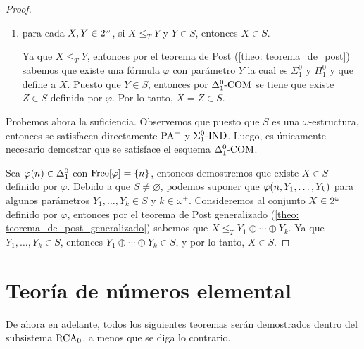 \begin{proof}
\begin{enumerate}
		Por lo tanto, $X\oplus Y\in S$.

		\item para cada $X, Y\in2^{\omega}$, si $X\leq_{T} Y$ y $Y\in S$, entonces $X\in S$.

		Ya que $X\leq_{T} Y$, entonces por el teorema de Post (\ref{theo: teorema_de_post}) sabemos que existe una fórmula $\varphi$ con parámetro $Y$ la cual es $\Sigma_{1}^{0}$ y $\Pi_{1}^{0}$ y que define a $X$. Puesto que $Y\in S$, entonces por $\Delta_{1}^{0}\text{-}\mathrm{COM}$ se tiene que existe $Z\in S$ definida por $\varphi$. Por lo tanto, $X = Z\in S$.
	\end{enumerate}

	Probemos ahora la suficiencia. Observemos que puesto que $S$ es una $\omega$-estructura, entonces se satisfacen directamente $\mathrm{PA}^{-}$ y $\Sigma_{1}^{0}\text{-}\mathrm{IND}$. Luego, es únicamente necesario demostrar que se satisface el esquema $\Delta_{1}^{0}\text{-}\mathrm{COM}$.

	Sea $\varphi\pa*{n}\in\Delta_{1}^{0}$ con $\mathrm{Free}\bra*{\varphi} =\set*{n}$, entonces demostremos que existe $X\in S$ definido por $\varphi$. Debido a que $S\neq\varnothing$, podemos suponer que $\varphi\pa*{n, Y_{1},\dotsc, Y_{k}}$ para algunos parámetros $Y_{1},\dotsc, Y_{k}\in S$ y $k\in\omega^{+}$. Consideremos al conjunto $X\in2^{\omega}$ definido por $\varphi$, entonces por el teorema de Post generalizado (\ref{theo: teorema_de_post_generalizado}) sabemos que $X\leq_{T}Y_{1}\oplus\dotsb\oplus Y_{k}$. Ya que $Y_{1},\dotsc, Y_{k}\in S$, entonces $Y_{1}\oplus\dotsb\oplus Y_{k}\in S$, y por lo tanto, $X\in S$.
\end{proof}

\section{Teoría de números elemental}

De ahora en adelante, todos los siguientes teoremas serán demostrados dentro del subsistema $\mathrm{RCA}_{0}$, a menos que se diga lo contrario.

